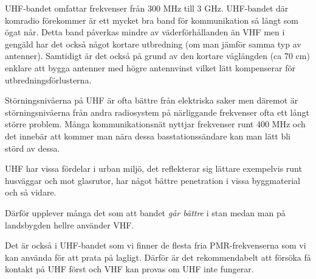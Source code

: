 UHF-bandet omfattar frekvenser från 300 MHz till 3 GHz. UHF-bandet där komradio förekommer är ett mycket bra band för kommunikation så långt som ögat når. Detta band påverkas mindre av väderförhållanden än VHF men i gengäld har det också något kortare utbredning (om man jämför samma typ av antenner). Samtidigt är det också på grund av den kortare våglängden (ca 70 cm) enklare att bygga antenner med högre antennvinst vilket lätt kompenserar för utbredningsförlusterna.

Störningsnivåerna på UHF är ofta bättre från elektriska saker men däremot är störningsnivåerna från andra radiosystem på närliggande frekvenser ofta ett långt större problem. Många kommunikationsnät nyttjar frekvenser runt 400 MHz och det innebär att kommer man nära dessa basstationssändare kan man lätt bli störd av dessa.

UHF har vissa fördelar i urban miljö, det reflekterar sig lättare exempelvis runt husväggar och mot glasrutor, har något bättre penetration i vissa byggmaterial och så vidare.

Därför upplever många det som att bandet \textit{går bättre} i stan medan man på landsbygden hellre använder VHF.

Det är också i UHF-bandet som vi finner de flesta fria PMR-frekvenserna som vi kan använda för att prata på lagligt. Därför är det rekommendabelt att försöka få kontakt på UHF först och VHF kan provas om UHF inte fungerar.

